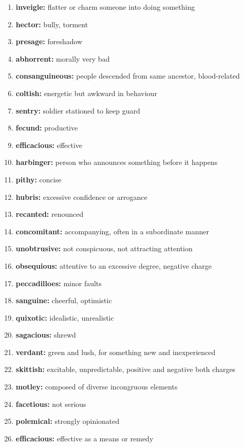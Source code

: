 \documentclass{article}
\begin{document}
\begin{enumerate}
    \item \textbf{inveigle: }{flatter or charm someone into doing something}
    \item \textbf{hector: }{bully, torment}
    \item \textbf{presage: }{foreshadow}
    \item \textbf{abhorrent: }{morally very bad}
    \item \textbf{consanguineous: }{people descended from same ancestor, blood-related}
    \item \textbf{coltish: }{energetic but awkward in behaviour}
    \item \textbf{sentry: }{soldier stationed to keep guard}
    \item \textbf{fecund: }{productive}
    \item \textbf{efficacious: }{effective}
    \item \textbf{harbinger: }{person who announces something before it happens}
    \item \textbf{pithy: }{concise}
    \item \textbf{hubris: }{excessive confidence or arrogance}
    \item \textbf{recanted: }{renounced}
    \item \textbf{concomitant: }{accompanying, often in a subordinate manner}
    \item \textbf{unobtrusive: }{not conspicuous, not attracting attention}
    \item \textbf{obsequious: }{attentive to an excessive degree, negative charge}
    \item \textbf{peccadilloes: }{minor faults}
    \item \textbf{sanguine: }{cheerful, optimistic}
    \item \textbf{quixotic: }{idealistic, unrealistic}
    \item \textbf{sagacious: }{shrewd}
    \item \textbf{verdant: }{green and lush, for something new and inexperienced}
    \item \textbf{skittish: }{excitable, unpredictable, positive and negative both charges}
    \item \textbf{motley: }{composed of diverse incongruous elements}
    \item \textbf{facetious: }{not serious}
    \item \textbf{polemical: }{strongly opinionated}
    \item \textbf{efficacious: }{effective as a means or remedy}

\end{enumerate}
\end{document}
